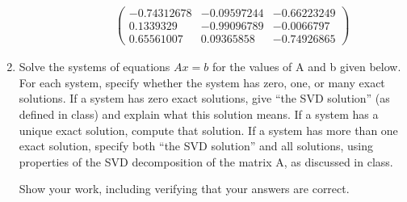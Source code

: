 \documentclass[conference,onecolumn]{IEEEtran}
\begin{document}
\begin{enumerate}[label=\arabic{enumi}.]
\begin{enumerate}
\begin{enumerate}
\begin{align*}
                                  \begin{pmatrix}
                                      -0.74312678 & -0.09597244 & -0.66223249 \\
                                      0.1339329   & -0.99096789 & -0.0066797  \\
                                      0.65561007  & 0.09365858  & -0.74926865
                                  \end{pmatrix}
                              \end{align*}
                    \end{enumerate}
          \end{enumerate}

          \clearpage
    \item Solve the systems of equations $Ax = b$ for the values of A and b given below.
          For each system, specify whether the system has zero, one, or many exact solutions.
          If a system has zero exact solutions, give “the SVD solution” (as defined in class) and explain what this solution means.
          If a system has a unique exact solution, compute that solution.
          If a system has more than one exact solution, specify both “the SVD solution” and all solutions, using properties of the SVD decomposition of the matrix A, as discussed in class.

          Show your work, including verifying that your answers are correct.


\end{enumerate}
\end{document}
